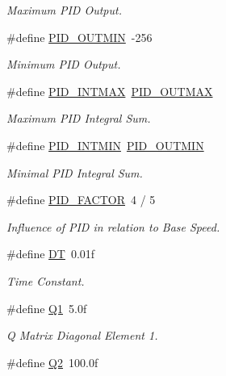 \begin{DoxyCompactItemize}
\begin{DoxyCompactList}\small\item\em Maximum P\-I\-D Output. \end{DoxyCompactList}\item 
\#define \hyperlink{group__config_ga684067981e82e4827607d0b0558812cb}{P\-I\-D\-\_\-\-O\-U\-T\-M\-I\-N}~-\/256
\begin{DoxyCompactList}\small\item\em Minimum P\-I\-D Output. \end{DoxyCompactList}\item 
\#define \hyperlink{group__config_ga50582411cbb3f8a20ffd3aa2254ddf71}{P\-I\-D\-\_\-\-I\-N\-T\-M\-A\-X}~\hyperlink{group__config_gaf36e4eab421932a006c7df7e84f11cf0}{P\-I\-D\-\_\-\-O\-U\-T\-M\-A\-X}
\begin{DoxyCompactList}\small\item\em Maximum P\-I\-D Integral Sum. \end{DoxyCompactList}\item 
\#define \hyperlink{group__config_ga9ee651f30455f25b5ca4c4bb9a0a6e49}{P\-I\-D\-\_\-\-I\-N\-T\-M\-I\-N}~\hyperlink{group__config_ga684067981e82e4827607d0b0558812cb}{P\-I\-D\-\_\-\-O\-U\-T\-M\-I\-N}
\begin{DoxyCompactList}\small\item\em Minimal P\-I\-D Integral Sum. \end{DoxyCompactList}\item 
\#define \hyperlink{group__config_ga0eb032986beceb6759aebd761c35a879}{P\-I\-D\-\_\-\-F\-A\-C\-T\-O\-R}~4 / 5
\begin{DoxyCompactList}\small\item\em Influence of P\-I\-D in relation to Base Speed. \end{DoxyCompactList}\item 
\#define \hyperlink{group__config_ga943f07034774ef1261d62cd0d3d1fec9}{D\-T}~0.\-01f
\begin{DoxyCompactList}\small\item\em Time Constant. \end{DoxyCompactList}\item 
\#define \hyperlink{group__config_ga0f32727853a3ac3d848701803c3b8688}{Q1}~5.\-0f
\begin{DoxyCompactList}\small\item\em Q Matrix Diagonal Element 1. \end{DoxyCompactList}\item 
\#define \hyperlink{group__config_gaf5bca4c32f8c6886a3d8c526d2e3e9a7}{Q2}~100.\-0f

\end{DoxyCompactItemize}
